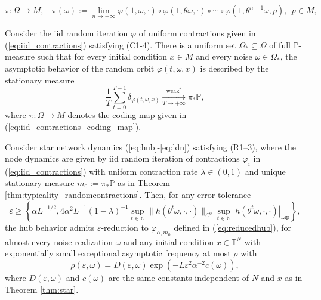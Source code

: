 \documentclass[10pt,a4paper]{amsart}
\newcommand{\N}{\mathbb{N}}
\newcommand{\PP}{\mathbb{P}}
\newcommand{\T}{\mathbb{T}}
\begin{document}
\begin{equation}\label{eq:iid_contractions_coding_map}
	\pi:\Omega\to M,~~~~\pi(\omega):=\lim_{n\to+\infty} \varphi(1,\omega,\cdot)\circ\varphi(1,\theta\omega,\cdot)\circ\cdots\circ \varphi(1,\theta^{n-1}\omega,p),~~p\in M,
\end{equation}

\begin{theorem}\label{thm:typicality_randomcontractions}
	Consider the iid random iteration $\varphi$ of uniform contractions given in (\ref{eq:iid_contractions}) satisfying (C1-4).	There is a uniform set $\Omega_*\subseteq \Omega$ of full $\PP$-measure such that for every initial condition $x\in M$ and every noise $\omega\in\Omega_*$, the asymptotic behavior of the random orbit $\varphi(t,\omega,x)$ is described by the stationary measure
	$$\frac{1}{T} \sum_{t=0}^{T-1} \delta_{\varphi(t,\omega,x)}\xrightarrow[T\to+\infty]{\text{weak}^*} \pi_{*}\PP,$$
	where $\pi:\Omega\to M$ denotes the coding map given in (\ref{eq:iid_contractions_coding_map}).
\end{theorem}

\begin{corollary}\label{cor:star_contractions}
	Consider star network dynamics (\ref{eq:hub}-\ref{eq:ldn}) satisfying (R1--3), where the node dynamics are given by iid random iteration of contractions $\varphi_i$ in (\ref{eq:iid_contractions}) with uniform contraction rate $\lambda\in(0,1)$ and unique stationary measure $m_0:=\pi_*\PP$ as in Theorem \ref{thm:typicality_randomcontractions}.
	Then, for any error tolerance 
	$$\varepsilon\geq \left\{\alpha L^{-1/2},4\alpha^2 L^{-1} (1-\lambda)^{-1}\sup_{t\in\N} \|h(\theta^t\omega,\cdot,\cdot)\|_{C^0} \sup_{t\in\N } |h(\theta^t\omega,\cdot,\cdot)|_{\mathrm{Lip}}\right\},$$
	the hub behavior admits $\varepsilon$-reduction to $\varphi_{\alpha,m_0}$ defined in (\ref{eq:reducedhub}), for almost every noise realization $\omega$ and any initial condition $x\in\T^N$ with exponentially small exceptional asymptotic frequency at most $\rho$ with
	$$\rho(\varepsilon,\omega)= D(\varepsilon,\omega)\exp(-L\varepsilon^2 \alpha^{-2}c(\omega)),$$
	where $D(\varepsilon,\omega)$ and $c(\omega)$ are the same constants independent of $N$ and $x$ as in Theorem \ref{thm:star}.
\end{corollary}
\end{document}
